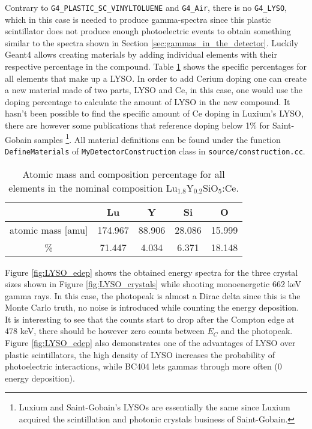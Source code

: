 Contrary to \texttt{G4\_PLASTIC\_SC\_VINYLTOLUENE} and \texttt{G4\_Air}, there is no \texttt{G4\_LYSO}, which in this case is needed to produce gamma-spectra since this plastic scintillator does not produce enough photoelectric events to obtain something similar to the spectra shown in Section \ref{sec:gammas_in_the_detector}. Luckily Geant4 allows creating materials by adding individual elements with their respective percentage in the compound. Table \ref{tab:LYSO_composition} shows the specific percentages for all elements that make up a LYSO. In order to add Cerium doping one can create a new material made of two parts, LYSO and Ce, in this case, one would use the doping percentage to calculate the amount of LYSO in the new compound. It hasn't been possible to find the specific amount of Ce doping in Luxium's LYSO, there are however some publications that reference doping below 1\% for Saint-Gobain samples \cite{Ce_doping,Ce_dopping_2}\footnote{Luxium and Saint-Gobain's LYSOs are essentially the same since Luxium acquired the scintillation and photonic crystals business of Saint-Gobain.}. All material definitions can be found under the function \texttt{DefineMaterials} of \texttt{MyDetectorConstruction} class in \texttt{source/construction.cc}.

\begin{table}[H]
  \caption{Atomic mass and composition percentage for all elements in the nominal composition Lu$_{1.8}$Y$_{0.2}$SiO$_5$:Ce.}
  \centering
  \begin{tabular}{ c c c c c}
    \midrule
     & Lu & Y & Si & O \\
    \midrule
    atomic mass [amu] & 174.967 & 88.906 & 28.086 & 15.999 \\
    \% & 71.447 & 4.034 & 6.371 & 18.148 \\
    \bottomrule
  \end{tabular}
  \label{tab:LYSO_composition}
\end{table}

Figure \ref{fig:LYSO_edep} shows the obtained energy spectra for the three crystal sizes shown in Figure \ref{fig:LYSO_crystals} while shooting monoenergetic 662 \unit{\kilo\eV} gamma rays. In this case, the photopeak is almost a Dirac delta since this is the Monte Carlo truth, no noise is introduced while counting the energy deposition. It is interesting to see that the counts start to drop after the Compton edge at 478 \unit{\kilo\eV}, there should be however zero counts between $E_C$ and the photopeak. Figure \ref{fig:LYSO_edep} also demonstrates one of the advantages of LYSO over plastic scintillators, the high density of LYSO increases the probability of photoelectric interactions, while BC404 lets gammas through more often (0 energy deposition).


